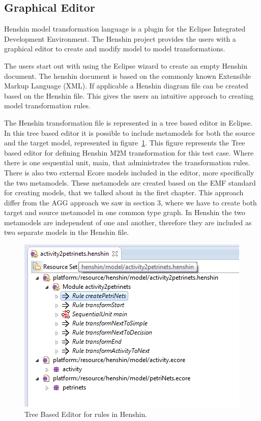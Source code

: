 \documentclass[pdftex,11pt,a4paper]{article}
\begin{document}
\subsection{Graphical Editor}
\noindent Henshin model transformation language is a plugin for the Eclipse
Integrated Development Environment\cite{Eclipse}. The Henshin project provides
the users with a graphical editor to create and modify model to model
transformations. 

The users start out with using the Eclipse wizard to create an empty Henshin
document. The henshin document is based on the commonly known Extensible Markup
Language (XML)\cite{XML}. If applicable a Henshin diagram file can be created
based on the Henshin file. This gives the users an intuitive approach to
creating model transformation rules.

The Henshin transformation file is represented in a tree based editor in
Eclipse. In this tree based editor it is possible to include metamodels for both
the source and the target model, represented in
figure~\ref{fig:Henshin_TreeEditor}. This figure represents the Tree based
editor for defining Henshin M2M transformation for this test case. Where
there is one sequential unit, main, that administrates the transformation
rules. There is also two external Ecore models included in the editor,
more specifically the two metamodels. These metamodels are created based on the
EMF standard for creating models, that we talked about in the first chapter.
This approach differ from the AGG approach we saw in section 3, where we have
to create both target and source metamodel in one common type graph. In Henshin
the two metamodels are independent of one and another, therefore they are
included as two separate models in the Henshin file. 

\begin{figure}[H]
	\centering
	\includegraphics[scale=0.7]{figures/Henshin_TreeEdtiro.png}
	\caption{Tree Based Editor for rules in Henshin.}
	\label{fig:Henshin_TreeEditor}
\end{figure}
\end{document}
